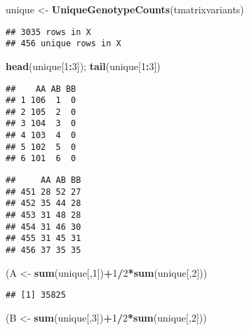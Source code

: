 \documentclass[]{article}
\newenvironment{Shaded}{\begin{snugshade}}{\end{snugshade}}
\newcommand{\KeywordTok}[1]{\textcolor[rgb]{0.13,0.29,0.53}{\textbf{#1}}}
\newcommand{\DecValTok}[1]{\textcolor[rgb]{0.00,0.00,0.81}{#1}}
\newcommand{\StringTok}[1]{\textcolor[rgb]{0.31,0.60,0.02}{#1}}
\newcommand{\OperatorTok}[1]{\textcolor[rgb]{0.81,0.36,0.00}{\textbf{#1}}}
\newcommand{\NormalTok}[1]{#1}
\begin{document}
\begin{Shaded}
\begin{Highlighting}[]
\NormalTok{unique <-}\StringTok{ }\KeywordTok{UniqueGenotypeCounts}\NormalTok{(tmatrixvariants)}
\end{Highlighting}
\end{Shaded}

\begin{verbatim}
## 3035 rows in X
## 456 unique rows in X
\end{verbatim}

\begin{Shaded}
\begin{Highlighting}[]
\KeywordTok{head}\NormalTok{(unique[}\DecValTok{1}\OperatorTok{:}\DecValTok{3}\NormalTok{]); }\KeywordTok{tail}\NormalTok{(unique[}\DecValTok{1}\OperatorTok{:}\DecValTok{3}\NormalTok{])}
\end{Highlighting}
\end{Shaded}

\begin{verbatim}
##    AA AB BB
## 1 106  1  0
## 2 105  2  0
## 3 104  3  0
## 4 103  4  0
## 5 102  5  0
## 6 101  6  0
\end{verbatim}

\begin{verbatim}
##     AA AB BB
## 451 28 52 27
## 452 35 44 28
## 453 31 48 28
## 454 31 46 30
## 455 31 45 31
## 456 37 35 35
\end{verbatim}

\begin{Shaded}
\begin{Highlighting}[]
\NormalTok{(A <-}\StringTok{ }\KeywordTok{sum}\NormalTok{(unique[,}\DecValTok{1}\NormalTok{])}\OperatorTok{+}\DecValTok{1}\OperatorTok{/}\DecValTok{2}\OperatorTok{*}\KeywordTok{sum}\NormalTok{(unique[,}\DecValTok{2}\NormalTok{]))}
\end{Highlighting}
\end{Shaded}

\begin{verbatim}
## [1] 35825
\end{verbatim}

\begin{Shaded}
\begin{Highlighting}[]
\NormalTok{(B <-}\StringTok{ }\KeywordTok{sum}\NormalTok{(unique[,}\DecValTok{3}\NormalTok{])}\OperatorTok{+}\DecValTok{1}\OperatorTok{/}\DecValTok{2}\OperatorTok{*}\KeywordTok{sum}\NormalTok{(unique[,}\DecValTok{2}\NormalTok{]))}
\end{Highlighting}
\end{Shaded}
\end{document}
